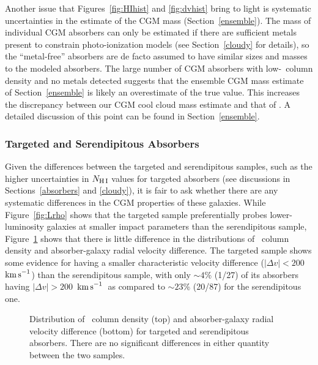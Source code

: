 \documentclass[twocolumn,twocolappendix,tighten,times]{aastex6}
\newcommand{\HI}{\ion{H}{1}}
\newcommand{\kms}{\ensuremath{{\rm km\,s}^{-1}}}
\begin{document}
Another issue that Figures~\ref{fig:HIhist} and \ref{fig:dvhist} bring to light 
is systematic uncertainties in the estimate of the CGM mass 
(Section~\ref{ensemble}). The mass of individual CGM 
absorbers can only be estimated if there are sufficient metals present to 
constrain photo-ionization models (see Section~\ref{cloudy} for details), 
so the ``metal-free'' absorbers are de facto assumed to have similar 
sizes and masses to the modeled absorbers. The large number of CGM absorbers 
with low-\HI\ column density and no metals detected suggests that the ensemble 
CGM mass estimate of Section~\ref{ensemble} is likely an 
overestimate of the true value. This increases the discrepancy between our 
CGM cool cloud mass estimate and that of \citet{werk14}. A detailed 
discussion of this point can be found in Section~\ref{ensemble}.


\subsubsection{Targeted and Serendipitous Absorbers}
\label{discussion:correlations:samples}

Given the differences between the targeted and serendipitous samples, such as 
the higher uncertainties in $N_{\rm H\,I}$ values for targeted absorbers 
(see discussions in Sections~\ref{absorbers} and \ref{cloudy}), it is fair 
to ask whether there are any systematic differences in the CGM properties of 
these galaxies. While Figure~\ref{fig:Lrho} shows that the targeted sample 
preferentially probes lower-luminosity galaxies at smaller impact parameters than 
the serendipitous sample, Figure~\ref{fig:samplehist} shows that there is little 
difference in the distributions of \HI\ column density and absorber-galaxy radial
velocity difference. The targeted sample shows some evidence for having a smaller 
characteristic velocity difference ($|\Delta v| < 200$~\kms) than the 
serendipitous sample, with only $\sim4$\% (1/27) of its absorbers having 
$|\Delta v| > 200$~\kms\ as compared to $\sim23$\% (20/87) for the serendipitous 
one. 


\begin{figure}[!t]
\caption{Distribution of \HI\ column density (top) and absorber-galaxy radial velocity difference (bottom) for targeted and serendipitous absorbers. There are no significant differences in either quantity between the two samples.
\label{fig:samplehist}}
\end{figure}
\end{document}
